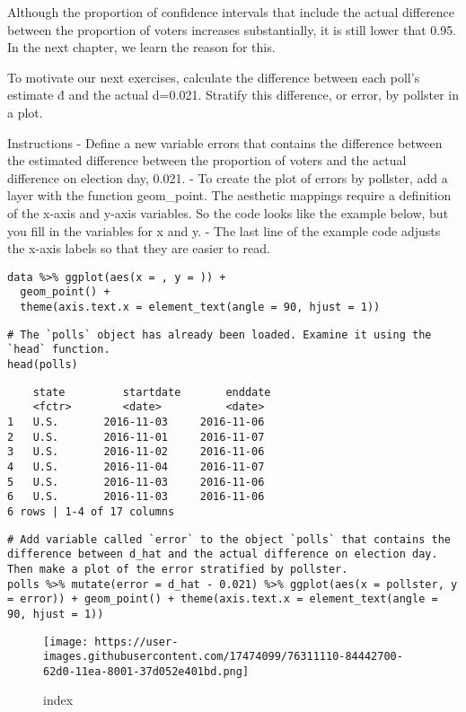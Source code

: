 \documentclass[
]{article}
\begin{document}
Although the proportion of confidence intervals that include the actual
difference between the proportion of voters increases substantially, it
is still lower that 0.95. In the next chapter, we learn the reason for
this.

To motivate our next exercises, calculate the difference between each
poll's estimate đ and the actual d=0.021. Stratify this difference, or
error, by pollster in a plot.

Instructions - Define a new variable errors that contains the difference
between the estimated difference between the proportion of voters and
the actual difference on election day, 0.021. - To create the plot of
errors by pollster, add a layer with the function geom\_point. The
aesthetic mappings require a definition of the x-axis and y-axis
variables. So the code looks like the example below, but you fill in the
variables for x and y. - The last line of the example code adjusts the
x-axis labels so that they are easier to read.

\begin{verbatim}
data %>% ggplot(aes(x = , y = )) +
  geom_point() +
  theme(axis.text.x = element_text(angle = 90, hjust = 1))
\end{verbatim}

\begin{verbatim}
# The `polls` object has already been loaded. Examine it using the `head` function.
head(polls)
\end{verbatim}

\begin{verbatim}
    state         startdate       enddate
    <fctr>        <date>          <date>
1   U.S.       2016-11-03     2016-11-06    
2   U.S.       2016-11-01     2016-11-07    
3   U.S.       2016-11-02     2016-11-06    
4   U.S.       2016-11-04     2016-11-07    
5   U.S.       2016-11-03     2016-11-06    
6   U.S.       2016-11-03     2016-11-06    
6 rows | 1-4 of 17 columns
\end{verbatim}

\begin{verbatim}
# Add variable called `error` to the object `polls` that contains the difference between d_hat and the actual difference on election day. Then make a plot of the error stratified by pollster.
polls %>% mutate(error = d_hat - 0.021) %>% ggplot(aes(x = pollster, y = error)) + geom_point() + theme(axis.text.x = element_text(angle = 90, hjust = 1))
\end{verbatim}

\begin{figure}
\centering
\texttt{[image: https://user-images.githubusercontent.com/17474099/76311110-84442700-62d0-11ea-8001-37d052e401bd.png]}
\caption{index}
\end{figure}
\end{document}
